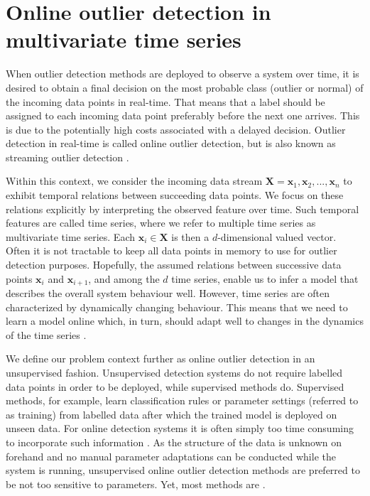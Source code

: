 \section{Online outlier detection in multivariate time series}
\label{sec:intro_problemcontext}

When outlier detection methods are deployed to observe a system over time, it is desired to obtain a final decision on the most probable class (outlier or normal) of the incoming data points in real-time. That means that a label should be assigned to each incoming data point preferably before the next one arrives. This is due to the potentially high costs associated with a delayed decision. Outlier detection in real-time is called online outlier detection, but is also known as streaming outlier detection \cite{gupta2014outlier}. 

Within this context, we consider the incoming data stream $\mathbf{X} = {\mathbf{x}_1, \mathbf{x}_{2},...,\mathbf{x}_{n}}$ to exhibit temporal relations between succeeding data points. We focus on these relations explicitly by interpreting the observed feature over time. Such temporal features are called time series, where we refer to multiple time series as multivariate time series. Each $\mathbf{x}_i \in \mathbf{X}$ is then a $d$-dimensional valued vector. Often it is not tractable to keep all data points in memory to use for outlier detection purposes. Hopefully, the assumed relations between successive data points $\mathbf{x}_i$ and $\mathbf{x}_{i+1}$, and among the $d$ time series, enable us to infer a model that describes the overall system behaviour well. However, time series are often characterized by dynamically changing behaviour. This means that we need to learn a model online which, in turn, should adapt well to changes in the dynamics of the time series \cite{ahmad2017unsupervised}.

We define our problem context further as online outlier detection in an unsupervised fashion. Unsupervised detection systems do not require labelled data points in order to be deployed, while supervised methods do. Supervised methods, for example, learn classification rules or parameter settings (referred to as training) from labelled data after which the trained model is deployed on unseen data. For online detection systems it is often simply too time consuming to incorporate such information \cite{ahmad2017unsupervised}. As the structure of the data is unknown on forehand and no manual parameter adaptations can be conducted while the system is running, unsupervised online outlier detection methods are preferred to be not too sensitive to parameters. Yet, most methods are \cite{aggarwal2015outlier}.

